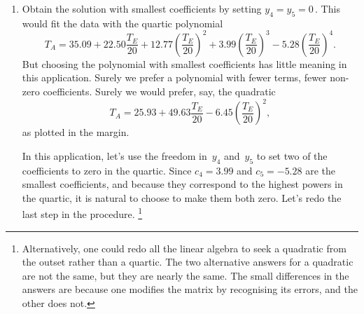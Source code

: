 \begin{example}
\begin{solution}
\begin{enumerate}
\item Obtain the solution with smallest coefficients by setting \(y_4=y_5=0\)\,.
This would fit the data with the quartic polynomial
{\small
\begin{equation*}
T_A=35.09+22.50\frac{T_E}{20} 
+12.77\left(\frac{T_E}{20}\right)^2
+3.99\left(\frac{T_E}{20}\right)^3
-5.28\left(\frac{T_E}{20}\right)^4.
\end{equation*}}%
But choosing the polynomial with smallest coefficients has little meaning in this application.
Surely we prefer a polynomial with fewer terms, fewer non-zero coefficients.
Surely we would prefer, say, the quadratic
\begin{equation*}
T_A=25.93+49.63\frac{T_E}{20} 
-6.45\left(\frac{T_E}{20}\right)^2,
\end{equation*}
as plotted in the margin.

In this application, let's use the freedom in~\(y_4\) and~\(y_5\) to set two of the coefficients to zero in the quartic.
Since \(c_4=3.99\) and \(c_5=-5.28\) are the smallest coefficients, and because they correspond to the highest powers in the quartic, it is natural to choose to make them both zero.
Let's redo the last step in the procedure.
\footnote{Alternatively, one could redo all the linear algebra to seek a quadratic from the outset rather than a quartic.  The two alternative answers for a quadratic are not the same, but they are nearly the same.  The small differences in the answers are because one modifies the matrix by recognising its errors, and the other does not.}


\end{enumerate}
\end{solution}
\end{example}
